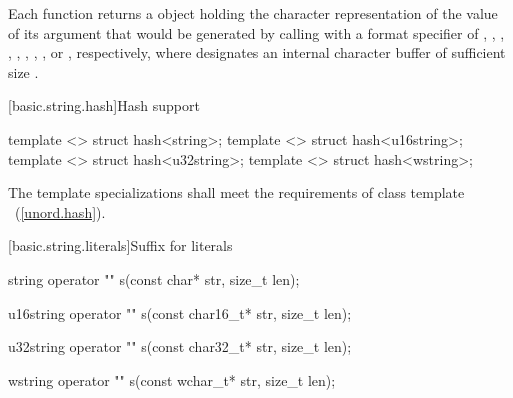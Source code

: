 \begin{itemdescr}
\pnum
\returns Each function returns a  object holding the character
representation of the value of its argument that would be generated by calling
 with a format specifier of
,
,
,
,
,
,
,
,
or , respectively, where  designates an
internal character buffer of sufficient size .
\end{itemdescr}

[basic.string.hash]{Hash support}

%
\begin{itemdecl}
template <> struct hash<string>;
template <> struct hash<u16string>;
template <> struct hash<u32string>;
template <> struct hash<wstring>;
\end{itemdecl}

\begin{itemdescr}
\pnum The template specializations shall meet the requirements of class template
~(\ref{unord.hash}).
\end{itemdescr}

[basic.string.literals]{Suffix for  literals}

\begin{itemdecl}
string operator "" s(const char* str, size_t len);
\end{itemdecl}

\begin{itemdescr}
\pnum
\returns
{}
\end{itemdescr}

\begin{itemdecl}
u16string operator "" s(const char16_t* str, size_t len);
\end{itemdecl}
\begin{itemdescr}
\pnum
\returns
{}
\end{itemdescr}

\begin{itemdecl}
u32string operator "" s(const char32_t* str, size_t len);
\end{itemdecl}
\begin{itemdescr}
\pnum
\returns
{}
\end{itemdescr}

\begin{itemdecl}
wstring operator "" s(const wchar_t* str, size_t len);
\end{itemdecl}
\begin{itemdescr}
\pnum
\returns
{}
\end{itemdescr}

